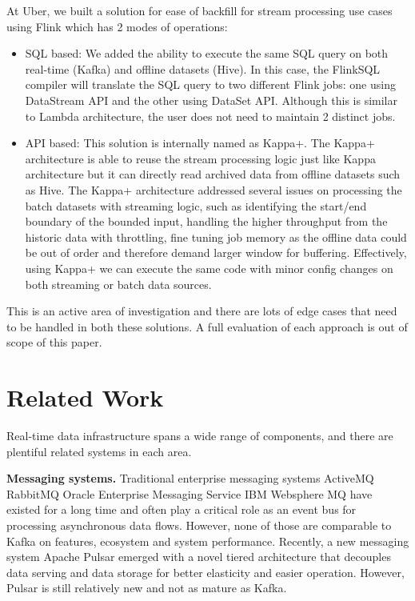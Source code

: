 \documentclass[sigconf]{acmart}
\begin{document}
At Uber, we built a solution for ease of backfill for stream processing use cases using Flink which has 2 modes of operations:

\begin{itemize}
    \item SQL based: We added the ability to execute the same SQL query on both real-time (Kafka) and offline datasets (Hive). In this case, the FlinkSQL compiler will translate the SQL query to two different Flink jobs: one using DataStream API and the other using DataSet API. Although this is similar to Lambda architecture, the user does not need to maintain 2 distinct jobs.
    
    \item API based: This solution is internally named as Kappa+\cite{kappa}. The Kappa+ architecture is able to reuse the stream processing logic just like Kappa architecture but it can directly read archived data from offline datasets such as Hive. The Kappa+ architecture addressed several issues on processing the batch datasets with streaming logic, such as identifying the start/end boundary of the bounded input, handling the higher throughput from the historic data with throttling, fine tuning job memory as the offline data could be out of order and therefore demand larger window for buffering. Effectively, using Kappa+ we can execute the same code with minor config changes on both streaming or batch data sources.
\end{itemize}

This is an active area of investigation and there are lots of edge cases that need to be handled in both these solutions. A full evaluation of each approach is out of scope of this paper.

\section{Related Work} \label{sec:related}

Real-time data infrastructure spans a wide range of components, and there are plentiful related systems in each area.

{\bfseries Messaging systems.} Traditional enterprise messaging systems ActiveMQ\cite{activemq} RabbitMQ\cite{rabbitmq} Oracle Enterprise Messaging Service\cite{oraclems} IBM Websphere MQ\cite{ibmsq} have existed for a long time and often play a critical role as an event bus for processing asynchronous data flows. However, none of those are comparable to Kafka on features, ecosystem and system performance. Recently, a new messaging system Apache Pulsar\cite{pulsar} emerged with a novel tiered architecture\cite{ramasamy2019unifying} that decouples data serving and data storage for better elasticity and easier operation. However, Pulsar is still relatively new and not as mature as Kafka. 
\end{document}
